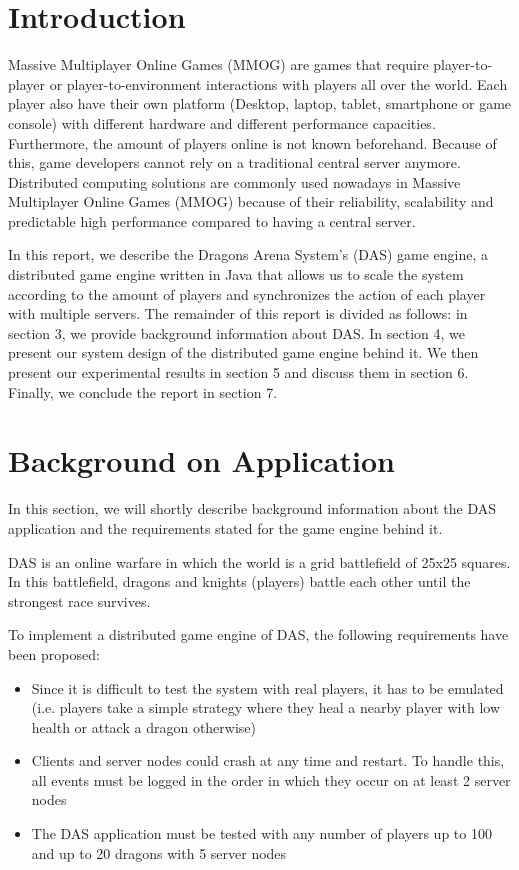\documentclass[a4paper,10pt]{article}
\begin{document}
\section{Introduction}
\label{sec:intro}

Massive Multiplayer Online Games (MMOG) are games that require player-to-player or player-to-environment interactions with players all over the world.
Each player also have their own platform (Desktop, laptop, tablet, smartphone or game console) with different hardware and different performance capacities.
Furthermore, the amount of players online is not known beforehand.
Because of this, game developers cannot rely on a traditional central server anymore.
Distributed computing solutions are commonly used nowadays in Massive Multiplayer Online Games (MMOG) because of their reliability,
scalability and predictable high performance compared to having a central server.

In this report, we describe the Dragons Arena System's (DAS) game engine,
a distributed game engine written in Java that allows us to scale the system according to the amount of players and synchronizes the action of each player with multiple servers.
The remainder of this report is divided as follows: in section 3, we provide background information about DAS.
In section 4, we present our system design of the distributed game engine behind it.
We then present our experimental results in section 5 and discuss them in section 6.
Finally, we conclude the report in section 7.


\section{Background on Application}
\label{sec:background}

In this section, we will shortly describe background information about the DAS application and the requirements stated for the game engine behind it.

DAS is an online warfare in which the world is a grid battlefield of 25x25 squares.
In this battlefield, dragons and knights (players) battle each other until the strongest race survives.

To implement a distributed game engine of DAS, the following requirements have been proposed:

\begin{itemize}
	\item Since it is difficult to test the system with real players, it has to be emulated (i.e. players take a simple strategy where they heal a nearby player with low health or attack a dragon otherwise)
	\item Clients and server nodes could crash at any time and restart. To handle this, all events must be logged in the order in which they occur on at least 2 server nodes
	\item The DAS application must be tested with any number of players up to 100 and up to 20 dragons with 5 server nodes
\end{itemize}
\end{document}
